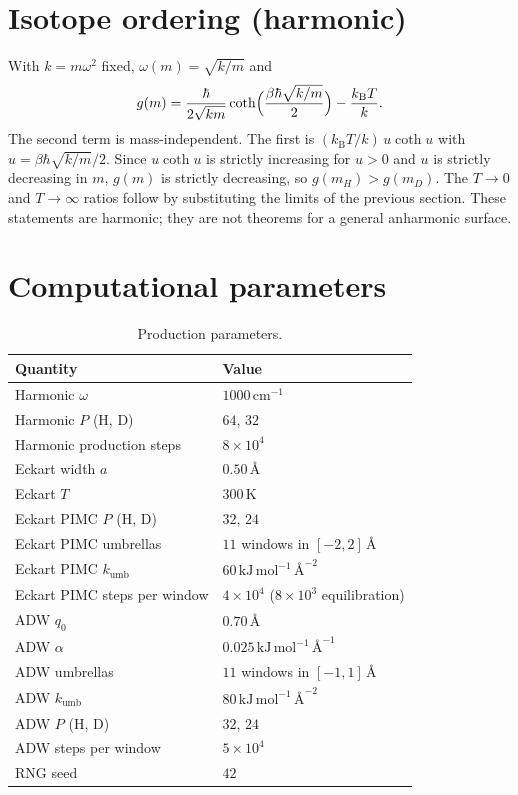 \documentclass[12pt]{article}
\newcommand{\kB}{k_{\mathrm{B}}}
\begin{document}
\section{Isotope ordering (harmonic)}

With $k=m\omega^2$ fixed, $\omega(m)=\sqrt{k/m}$ and
\begin{equation}
  g(m)
  =
  \frac{\hbar}{2\sqrt{km}}\coth\Bigl(\frac{\beta\hbar\sqrt{k/m}}{2}\Bigr)
  -\frac{\kB T}{k}.
\end{equation}
The second term is mass-independent. The first is $( \kB T/k)\,u\coth u$ with $u=\beta\hbar\sqrt{k/m}/2$. Since $u\coth u$ is strictly increasing for $u>0$ and $u$ is strictly decreasing in $m$, $g(m)$ is strictly decreasing, so $g(m_H)>g(m_D)$. The $T\to 0$ and $T\to\infty$ ratios follow by substituting the limits of the previous section. These statements are harmonic; they are not theorems for a general anharmonic surface.

\section{Computational parameters}

\begin{table}[htbp]
\centering
\caption{Production parameters.}
\begin{tabular}{ll}
\toprule
Quantity & Value \\
\midrule
Harmonic $\omega$ & $1000\,\mathrm{cm}^{-1}$ \\
Harmonic $P$ (H, D) & $64$, $32$ \\
Harmonic production steps & $8\times 10^4$ \\
Eckart width $a$ & $0.50\,\text{\AA}$ \\
Eckart $T$ & $300\,\mathrm{K}$ \\
Eckart PIMC $P$ (H, D) & $32$, $24$ \\
Eckart PIMC umbrellas & $11$ windows in $[-2,2]\,\text{\AA}$ \\
Eckart PIMC $k_{\mathrm{umb}}$ & $60\,\mathrm{kJ\,mol}^{-1}\,\text{\AA}^{-2}$ \\
Eckart PIMC steps per window & $4\times 10^4$ ($8\times 10^3$ equilibration) \\
ADW $q_0$ & $0.70\,\text{\AA}$ \\
ADW $\alpha$ & $0.025\,\mathrm{kJ\,mol}^{-1}\,\text{\AA}^{-1}$ \\
ADW umbrellas & $11$ windows in $[-1,1]\,\text{\AA}$ \\
ADW $k_{\mathrm{umb}}$ & $80\,\mathrm{kJ\,mol}^{-1}\,\text{\AA}^{-2}$ \\
ADW $P$ (H, D) & $32$, $24$ \\
ADW steps per window & $5\times 10^4$ \\
RNG seed & $42$ \\
\bottomrule
\end{tabular}
\end{table}
\end{document}
